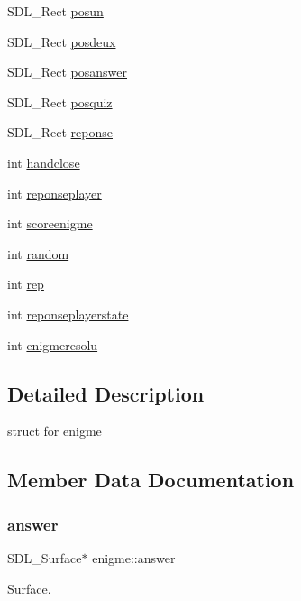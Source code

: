 \begin{DoxyCompactItemize}
S\+D\+L\+\_\+\+Rect \hyperlink{structenigme_aa81898935156d1686a81ec6cb8e7507f}{posun}
\item 
S\+D\+L\+\_\+\+Rect \hyperlink{structenigme_a8c486911736ba0204568761927c6b9f3}{posdeux}
\item 
S\+D\+L\+\_\+\+Rect \hyperlink{structenigme_ad00e6674a1862c35b676d2086dc66265}{posanswer}
\item 
S\+D\+L\+\_\+\+Rect \hyperlink{structenigme_a6078fdf410db065ce21e11599ca6d0a4}{posquiz}
\item 
S\+D\+L\+\_\+\+Rect \hyperlink{structenigme_aa15496361ed73c0ba5df2793370fd6d8}{reponse}
\item 
int \hyperlink{structenigme_a0f991a3c8fad2da556415fbc89df477b}{handclose}
\item 
int \hyperlink{structenigme_a092b8c95c440e6fe68572bb4f80882ad}{reponseplayer}
\item 
int \hyperlink{structenigme_a5c3c1be5f426abd6512176b9f31b90e7}{scoreenigme}
\item 
int \hyperlink{structenigme_aca75de3e0894e4e56e0f84a19adfc37e}{random}
\item 
int \hyperlink{structenigme_a9c96fd872bc111d42c394eb466cfc50a}{rep}
\item 
int \hyperlink{structenigme_ab94caae0675568e58f44e338c4582046}{reponseplayerstate}
\item 
int \hyperlink{structenigme_ae821671d03e9a9e29afb7a17882cd490}{enigmeresolu}
\end{DoxyCompactItemize}


\subsection{Detailed Description}
struct for enigme 

\subsection{Member Data Documentation}
\mbox{\label{structenigme_a5b9bd47c2083476b1c20af8544b3e58e}} 
\subsubsection{\texorpdfstring{answer}{answer}}
{\footnotesize\ttfamily S\+D\+L\+\_\+\+Surface$\ast$ enigme\+::answer}

Surface. \mbox{\label{structenigme_afef580eaca259227dac7bbae2d09f8f7}} 
